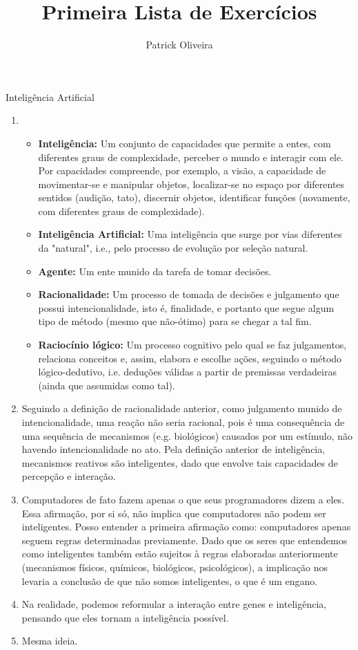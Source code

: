 \documentclass{article}
\title{Primeira Lista de Exercícios}
\author{Patrick Oliveira}
\affil{}
\begin{document}
\maketitle

Inteligência Artificial

\begin{enumerate}
	\item
		\begin{itemize}
			\item \textbf{Inteligência:} Um conjunto de capacidades que permite a entes, com diferentes graus de complexidade, perceber o mundo e interagir com ele. Por capacidades compreende, por exemplo, a visão, a capacidade de movimentar-se e manipular objetos, localizar-se no espaço por diferentes sentidos (audição, tato), discernir objetos, identificar funções (novamente, com diferentes graus de complexidade).
			\item \textbf{Inteligência Artificial:} Uma inteligência que surge por vias diferentes da "natural", i.e., pelo processo de evolução por seleção natural.
			\item \textbf{Agente:} Um ente munido da tarefa de tomar decisões.
			\item \textbf{Racionalidade:} Um processo de tomada de decisões e julgamento que possui intencionalidade, isto é, finalidade, e portanto que segue algum tipo de método (mesmo que não-ótimo) para se chegar a tal fim.
			\item \textbf{Raciocínio lógico:} Um processo cognitivo pelo qual se faz julgamentos, relaciona conceitos e, assim, elabora e escolhe ações, seguindo o método lógico-dedutivo, i.e. deduções válidas a partir de premissas verdadeiras (ainda que assumidas como tal).
		\end{itemize}
	\item Seguindo a definição de racionalidade anterior, como julgamento munido de intencionalidade, uma reação não seria racional, pois é uma consequência de uma sequência de mecanismos (e.g. biológicos) causados por um estímulo, não havendo intencionalidade no ato. Pela definição anterior de inteligência, mecanismos reativos são inteligentes, dado que envolve tais capacidades de percepção e interação.
	\item Computadores de fato fazem apenas o que seus programadores dizem a eles. Essa afirmação, por si só, não implica que computadores não podem ser inteligentes. Posso entender a primeira afirmação como: computadores apenas seguem regras determinadas previamente. Dado que os seres que entendemos como inteligentes também estão sujeitos à regras elaboradas anteriormente (mecanismos físicos, químicos, biológicos, psicológicos), a implicação nos levaria a conclusão de que não somos inteligentes, o que é um engano.
	\item Na realidade, podemos reformular a interação entre genes e inteligência, pensando que eles tornam a inteligência possível.
	\item Mesma ideia.
\end{enumerate}
\end{document}
